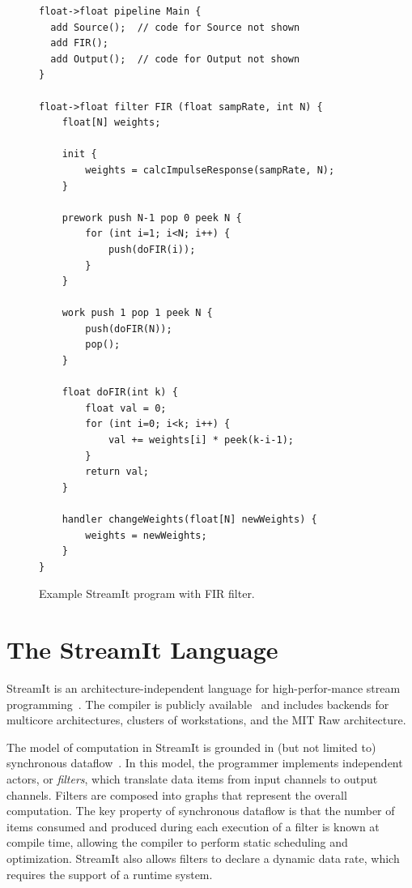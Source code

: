 \begin{figure}[t]
\eightpoint
\begin{verbatim}
float->float pipeline Main {
  add Source();  // code for Source not shown
  add FIR();
  add Output();  // code for Output not shown
}

float->float filter FIR (float sampRate, int N) {
    float[N] weights;

    init {
        weights = calcImpulseResponse(sampRate, N);
    }

    prework push N-1 pop 0 peek N {
        for (int i=1; i<N; i++) {
            push(doFIR(i));
        }
    }

    work push 1 pop 1 peek N {
        push(doFIR(N));
        pop();
    }

    float doFIR(int k) {
        float val = 0;
        for (int i=0; i<k; i++) {
            val += weights[i] * peek(k-i-1);
        }
        return val;
    }

    handler changeWeights(float[N] newWeights) {
        weights = newWeights;
    }
}
\end{verbatim}

\caption{Example StreamIt program with FIR filter.\protect\label{fig:fir-pipeline}}
\end{figure}

\section{The StreamIt Language}

StreamIt is an architecture-independent language for high-perfor-mance
stream programming~\cite{thies-cc02}.  The compiler is publicly
available~\cite{streamitweb} and includes backends for multicore
architectures, clusters of workstations, and the MIT Raw architecture.

The model of computation in StreamIt is grounded in (but not limited
to) synchronous dataflow~\cite{lee87}.  In this model, the programmer
implements independent actors, or {\it filters}, which translate data
items from input channels to output channels.  Filters are composed
into graphs that represent the overall computation.  The key property
of synchronous dataflow is that the number of items consumed and
produced during each execution of a filter is known at compile time,
allowing the compiler to perform static scheduling and optimization.
StreamIt also allows filters to declare a dynamic data rate, which
requires the support of a runtime system.

